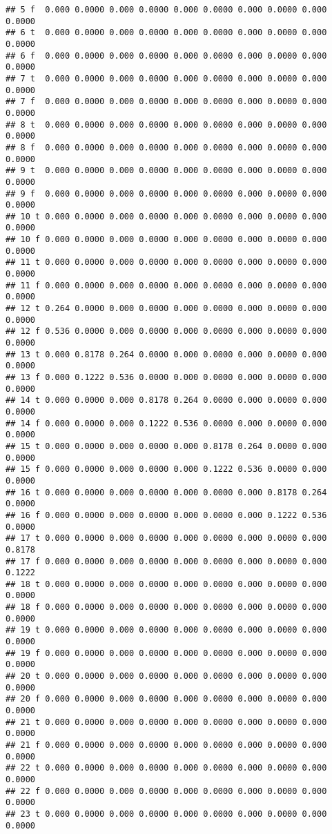 \documentclass[]{article}
\begin{document}
\begin{verbatim}
## 5 f  0.000 0.0000 0.000 0.0000 0.000 0.0000 0.000 0.0000 0.000 0.0000
## 6 t  0.000 0.0000 0.000 0.0000 0.000 0.0000 0.000 0.0000 0.000 0.0000
## 6 f  0.000 0.0000 0.000 0.0000 0.000 0.0000 0.000 0.0000 0.000 0.0000
## 7 t  0.000 0.0000 0.000 0.0000 0.000 0.0000 0.000 0.0000 0.000 0.0000
## 7 f  0.000 0.0000 0.000 0.0000 0.000 0.0000 0.000 0.0000 0.000 0.0000
## 8 t  0.000 0.0000 0.000 0.0000 0.000 0.0000 0.000 0.0000 0.000 0.0000
## 8 f  0.000 0.0000 0.000 0.0000 0.000 0.0000 0.000 0.0000 0.000 0.0000
## 9 t  0.000 0.0000 0.000 0.0000 0.000 0.0000 0.000 0.0000 0.000 0.0000
## 9 f  0.000 0.0000 0.000 0.0000 0.000 0.0000 0.000 0.0000 0.000 0.0000
## 10 t 0.000 0.0000 0.000 0.0000 0.000 0.0000 0.000 0.0000 0.000 0.0000
## 10 f 0.000 0.0000 0.000 0.0000 0.000 0.0000 0.000 0.0000 0.000 0.0000
## 11 t 0.000 0.0000 0.000 0.0000 0.000 0.0000 0.000 0.0000 0.000 0.0000
## 11 f 0.000 0.0000 0.000 0.0000 0.000 0.0000 0.000 0.0000 0.000 0.0000
## 12 t 0.264 0.0000 0.000 0.0000 0.000 0.0000 0.000 0.0000 0.000 0.0000
## 12 f 0.536 0.0000 0.000 0.0000 0.000 0.0000 0.000 0.0000 0.000 0.0000
## 13 t 0.000 0.8178 0.264 0.0000 0.000 0.0000 0.000 0.0000 0.000 0.0000
## 13 f 0.000 0.1222 0.536 0.0000 0.000 0.0000 0.000 0.0000 0.000 0.0000
## 14 t 0.000 0.0000 0.000 0.8178 0.264 0.0000 0.000 0.0000 0.000 0.0000
## 14 f 0.000 0.0000 0.000 0.1222 0.536 0.0000 0.000 0.0000 0.000 0.0000
## 15 t 0.000 0.0000 0.000 0.0000 0.000 0.8178 0.264 0.0000 0.000 0.0000
## 15 f 0.000 0.0000 0.000 0.0000 0.000 0.1222 0.536 0.0000 0.000 0.0000
## 16 t 0.000 0.0000 0.000 0.0000 0.000 0.0000 0.000 0.8178 0.264 0.0000
## 16 f 0.000 0.0000 0.000 0.0000 0.000 0.0000 0.000 0.1222 0.536 0.0000
## 17 t 0.000 0.0000 0.000 0.0000 0.000 0.0000 0.000 0.0000 0.000 0.8178
## 17 f 0.000 0.0000 0.000 0.0000 0.000 0.0000 0.000 0.0000 0.000 0.1222
## 18 t 0.000 0.0000 0.000 0.0000 0.000 0.0000 0.000 0.0000 0.000 0.0000
## 18 f 0.000 0.0000 0.000 0.0000 0.000 0.0000 0.000 0.0000 0.000 0.0000
## 19 t 0.000 0.0000 0.000 0.0000 0.000 0.0000 0.000 0.0000 0.000 0.0000
## 19 f 0.000 0.0000 0.000 0.0000 0.000 0.0000 0.000 0.0000 0.000 0.0000
## 20 t 0.000 0.0000 0.000 0.0000 0.000 0.0000 0.000 0.0000 0.000 0.0000
## 20 f 0.000 0.0000 0.000 0.0000 0.000 0.0000 0.000 0.0000 0.000 0.0000
## 21 t 0.000 0.0000 0.000 0.0000 0.000 0.0000 0.000 0.0000 0.000 0.0000
## 21 f 0.000 0.0000 0.000 0.0000 0.000 0.0000 0.000 0.0000 0.000 0.0000
## 22 t 0.000 0.0000 0.000 0.0000 0.000 0.0000 0.000 0.0000 0.000 0.0000
## 22 f 0.000 0.0000 0.000 0.0000 0.000 0.0000 0.000 0.0000 0.000 0.0000
## 23 t 0.000 0.0000 0.000 0.0000 0.000 0.0000 0.000 0.0000 0.000 0.0000

\end{verbatim}
\end{document}
